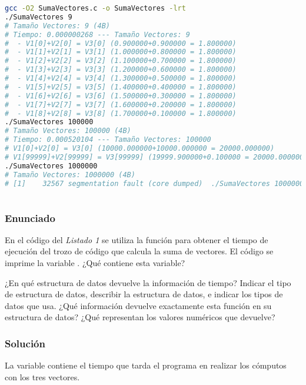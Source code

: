 \begin{lstlisting}[language=sh]
gcc -O2 SumaVectores.c -o SumaVectores -lrt
./SumaVectores 9
# Tamaño Vectores: 9 (4B)
# Tiempo: 0.000000268 --- Tamaño Vectores: 9
#  - V1[0]+V2[0] = V3[0] (0.900000+0.900000 = 1.800000)
#  - V1[1]+V2[1] = V3[1] (1.000000+0.800000 = 1.800000)
#  - V1[2]+V2[2] = V3[2] (1.100000+0.700000 = 1.800000)
#  - V1[3]+V2[3] = V3[3] (1.200000+0.600000 = 1.800000)
#  - V1[4]+V2[4] = V3[4] (1.300000+0.500000 = 1.800000)
#  - V1[5]+V2[5] = V3[5] (1.400000+0.400000 = 1.800000)
#  - V1[6]+V2[6] = V3[6] (1.500000+0.300000 = 1.800000)
#  - V1[7]+V2[7] = V3[7] (1.600000+0.200000 = 1.800000)
#  - V1[8]+V2[8] = V3[8] (1.700000+0.100000 = 1.800000)
./SumaVectores 100000
# Tamaño Vectores: 100000 (4B)
# Tiempo: 0.000520104 --- Tamaño Vectores: 100000
# V1[0]+V2[0] = V3[0] (10000.000000+10000.000000 = 20000.000000)
# V1[99999]+V2[99999] = V3[99999] (19999.900000+0.100000 = 20000.000000)
./SumaVectores 1000000
# Tamaño Vectores: 1000000 (4B)
# [1]    32567 segmentation fault (core dumped)  ./SumaVectores 1000000
\end{lstlisting}

\section{}\label{ej1-6}

\subsubsection{Enunciado}
En el código del \textit{Listado 1} se utiliza la función  para obtener el tiempo de ejecución del trozo de código que calcula la suma de vectores.
El código se imprime la variable .
¿Qué contiene esta variable?

¿En qué estructura de datos devuelve  la información de tiempo?
Indicar el tipo de estructura de datos, describir la estructura de datos, e indicar los tipos de datos que usa.
¿Qué información devuelve exactamente esta función en su estructura de datos?
¿Qué representan los valores numéricos que devuelve?

\subsubsection{Solución}

La variable  contiene el tiempo que tarda el programa en realizar los cómputos con los tres vectores.

